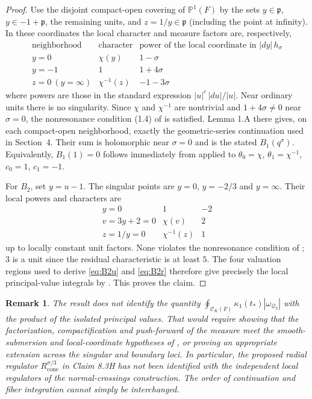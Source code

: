 \documentclass[12pt,letterpaper]{amsart}
\newtheorem{remark}[lemma]{Remark}
\begin{document}
\begin{proof}
Use the disjoint compact-open covering of $\mathbb P^1(F)$ by the sets
$y\in\mathfrak p$, $y\in-1+\mathfrak p$, the remaining units, and
$z=1/y\in\mathfrak p$ (including the point at infinity).
In these coordinates the local character and measure factors are,
respectively,
\[
\begin{array}{c|c|c}
 \text{neighborhood}&\text{character}&\text{power of the local coordinate in }|dy|\,h_\sigma\\
 \hline
 y=0 &\chi(y)&1-\sigma\\
 y=-1 &1&1+4\sigma\\
 z=0\ (y=\infty)&\chi^{-1}(z)&-1-3\sigma
\end{array}
\]
where powers are those in the standard expression
$|u|^c\,|du|/|u|$. Near ordinary units there is no singularity.
Since $\chi$ and $\chi^{-1}$ are nontrivial and $1+4\sigma\ne0$ near
$\sigma=0$, the nonresonance condition (1.4) of \cite{LS83} is satisfied.
Lemma 1.A there gives, on each compact-open neighborhood, exactly the
geometric-series continuation used in Section~4. Their sum is holomorphic
near $\sigma=0$ and is the stated $B_1(q^\sigma)$. Equivalently,
$B_1(1)=0$ follows immediately from \cite[Lemma 1.C]{LS83} applied to
$\theta_0=\chi$, $\theta_1=\chi^{-1}$, $c_0=1$, $c_1=-1$.

For $B_2$, set $y=u-1$. The singular points are $y=0$, $y=-2/3$ and
$y=\infty$. Their local powers and characters are
\[
\begin{array}{c|c|c}
 y=0&1&-2\\
 v=3y+2=0&\chi(v)&2\\
 z=1/y=0&\chi^{-1}(z)&1
\end{array}
\]
up to locally constant unit factors. None violates the nonresonance
condition of \cite[(1.4)]{LS83}; $3$ is a unit since the residual
characteristic is at least $5$. The four valuation regions used to derive
\eqref{eq:B2u} and \eqref{eq:B2r} therefore give precisely the local
principal-value integrals by \cite[Lemma 1.A]{LS83}. This proves the claim.
\end{proof}

\begin{remark}\label{rem:global-pv}
The result does \emph{not} identify the quantity
$\oint_{\mathcal C_K(F)}\kappa_1(t_*)|\omega_{\mathcal Q_3}|$
with the product of the isolated principal values. That would require
showing that the factorization, compactification and push-forward of the
measure meet the smooth-submersion and local-coordinate hypotheses of
\cite[Lemma 1.F]{LS83}, or proving an appropriate extension across the
singular and boundary loci. In particular, the proposed radial regulator
$R_{\mathrm{cone}}^{\sigma/3}$ in Claim 8.3H has not been identified with
the independent local regulators of the normal-crossings construction.
The order of continuation and fiber integration cannot simply be interchanged.
\end{remark}
\end{document}
